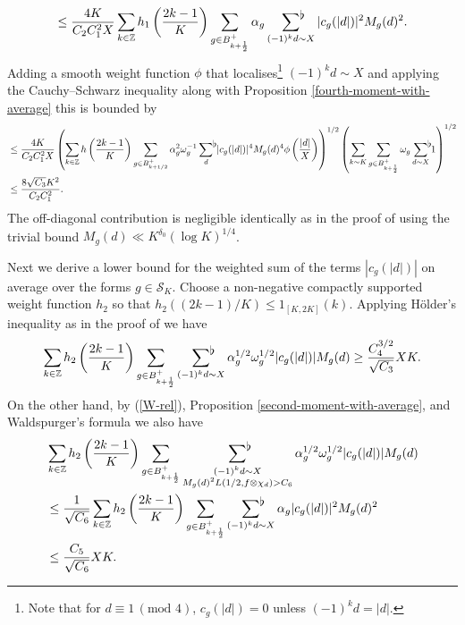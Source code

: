 \documentclass[a4paper,10pt,twoside]{amsart}
\theoremstyle{definition}
\numberwithin{equation}{section}
\newcommand\Z{\mathbb{Z}}
\renewcommand\:{\colon}
\newcommand{\sumflat}{\mathop{{\sum}^{\raisebox{-3pt}{\makebox[0pt][l]{$\flat$}}}}}
\begin{document}
\[\leq \frac {4K}{C_2C_1^2X}\sum_{k\in\Z}h_1\left(\frac{2k-1}K\right)\sum_{g\in B_{k+\frac12}^+}\alpha_g\sumflat_{(-1)^kd\sim X}|c_g(|d|)|^2M_g(d)^2.\]
Adding a smooth weight function $\phi$ that localises\footnote{Note that for $d\equiv 1\,(\text{mod }4)$, $c_g(|d|)=0$ unless $(-1)^kd=|d|$.} $(-1)^kd\sim X$ and applying the Cauchy--Schwarz inequality along with Proposition \ref{fourth-moment-with-average} this is bounded by
\begin{align*}
&\leq\frac{4K}{C_2C_1^2X}\left(\sum_{k\in\Z}h\left(\frac{2k-1}K\right)\sum_{g\in B_{k+1/2}^+}\alpha_g^2\omega_g^{-1}\sumflat_d\,|c_g(|d|)|^4M_g(d)^4\phi\left(\frac{|d|}X\right)\right)^{1/2}\left(\sum_{k\sim K}\sum_{g\in B_{k+\frac12}^+}\omega_g\sumflat_{d\sim X}1\right)^{1/2}\\
&\leq\frac{8\sqrt{C_3}K^2}{C_2C_1^2}. 
\end{align*}
The off-diagonal contribution is negligible identically as in the proof of \cite[Proposition 2.5.]{Jaasaari2026} using the trivial bound $M_g(d)\ll K^{\delta_0}(\log K)^{1/4}$. 

Next we derive a lower bound for the weighted sum of the terms $|c_g(|d|)|$ on average over the forms $g\in\mathcal S_K$. Choose a non-negative compactly supported weight function $h_2$ so that $h_2((2k-1)/K)\leq 1_{[K,2K]}(k)$. Applying H\"older's inequality as in the proof of \cite[Proposition 2.6.]{Jaasaari2026} we have 
\begin{align*}
\sum_{k\in\Z}h_2\left(\frac{2k-1}K\right)\sum_{g\in B_{k+\frac12}^+}\sumflat_{(-1)^kd\sim X}\alpha_g^{1/2}\omega_g^{1/2}|c_g(|d|)|M_g(d)\geq \frac{C_4^{3/2}}{\sqrt{C_3}}XK.
\end{align*}
On the other hand, by (\ref{W-rel}), Proposition \ref{second-moment-with-average}, and Waldspurger's formula we also have 
\begin{align*}
&\sum_{k\in\Z}h_2\left(\frac{2k-1}K\right)\sum_{g\in B_{k+\frac12}^+}\sumflat_{\substack{(-1)^kd\sim X\\
M_g(d)^2L(1/2,f\otimes \chi_{d})>C_6}}\alpha_g^{1/2}\omega_g^{1/2}|c_g(|d|)|M_g(d)\\
&\leq\frac1{\sqrt{C_6}}\sum_{k\in\Z}h_2\left(\frac{2k-1}K\right)\sum_{g\in B_{k+\frac12}^+}\sumflat_{(-1)^k d\sim X}\alpha_g|c_g(|d|)|^2M_g(d)^2\\
&\leq\frac{C_5}{\sqrt{C_6}}XK.
\end{align*}
\end{document}

